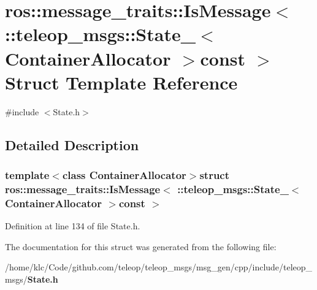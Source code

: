 \section{ros::message\_\-traits::IsMessage$<$ ::teleop\_\-msgs::State\_\-$<$ ContainerAllocator $>$const $>$ Struct Template Reference}
\label{structros_1_1message__traits_1_1IsMessage_3_01_1_1teleop__msgs_1_1State___3_01ContainerAllocator_01_4const_01_01_4}


{\ttfamily \#include $<$State.h$>$}



\subsection{Detailed Description}
\subsubsection*{template$<$class ContainerAllocator$>$struct ros::message\_\-traits::IsMessage$<$ ::teleop\_\-msgs::State\_\-$<$ ContainerAllocator $>$const  $>$}



Definition at line 134 of file State.h.



The documentation for this struct was generated from the following file:\begin{DoxyCompactItemize}
\item 
/home/klc/Code/github.com/teleop/teleop\_\-msgs/msg\_\-gen/cpp/include/teleop\_\-msgs/{\bf State.h}\end{DoxyCompactItemize}
